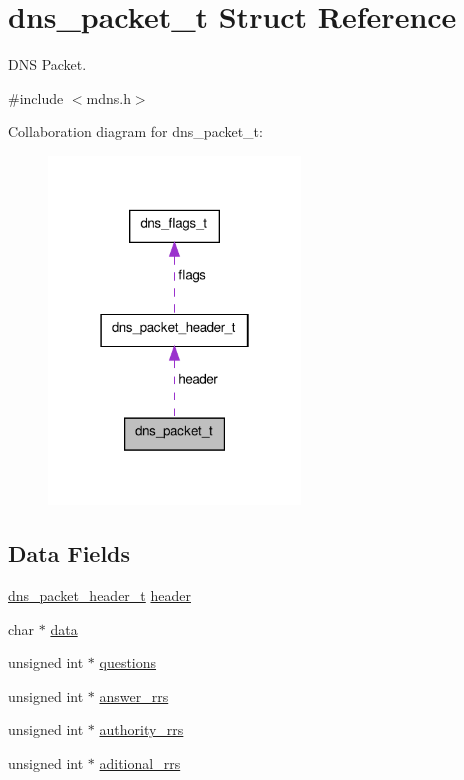 \hypertarget{structdns__packet__t}{\section{dns\-\_\-packet\-\_\-t Struct Reference}
\label{structdns__packet__t}
}


D\-N\-S Packet.  




{\ttfamily \#include $<$mdns.\-h$>$}



Collaboration diagram for dns\-\_\-packet\-\_\-t\-:
\nopagebreak
\begin{figure}[H]
\begin{center}
\leavevmode
\includegraphics[width=190pt]{structdns__packet__t__coll__graph}
\end{center}
\end{figure}
\subsection*{Data Fields}
\begin{DoxyCompactItemize}
\item 
\hyperlink{structdns__packet__header__t}{dns\-\_\-packet\-\_\-header\-\_\-t} \hyperlink{structdns__packet__t_ae40246d3fea48323550a8957db1bd5c1}{header}
\item 
char $\ast$ \hyperlink{structdns__packet__t_a91a70b77df95bd8b0830b49a094c2acb}{data}
\item 
unsigned int $\ast$ \hyperlink{structdns__packet__t_a8053eea6cc5a03a184473df63560d978}{questions}
\item 
unsigned int $\ast$ \hyperlink{structdns__packet__t_ae0c9f53013dea2787cfdf2cff74b76ba}{answer\-\_\-rrs}
\item 
unsigned int $\ast$ \hyperlink{structdns__packet__t_abef983e2aec9c20ff1da712f4030fdba}{authority\-\_\-rrs}
\item 
unsigned int $\ast$ \hyperlink{structdns__packet__t_afa34bab568a73c5af6fc84ed676ed21f}{aditional\-\_\-rrs}
\end{DoxyCompactItemize}


